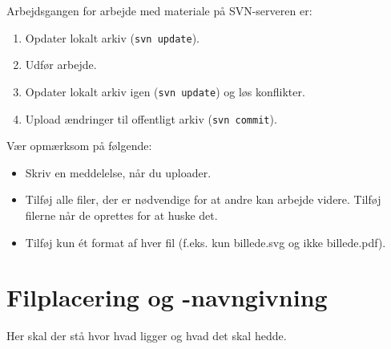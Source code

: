 \documentclass[simple,final]{../mypaper}
\begin{document}
Arbejdsgangen for arbejde med materiale på SVN-serveren er:

\begin{enumerate}
\item Opdater lokalt arkiv (\texttt{svn update}).
\item Udfør arbejde.
\item Opdater lokalt arkiv igen (\texttt{svn update}) og løs
  konflikter.
\item Upload ændringer til offentligt arkiv (\texttt{svn commit}).
\end{enumerate}

Vær opmærksom på følgende:

\begin{itemize}
\item Skriv en meddelelse, når du uploader.
\item Tilføj alle filer, der er nødvendige for at andre kan arbejde
  videre. Tilføj filerne når de oprettes for at huske det.
\item Tilføj kun ét format af hver fil (f.eks. kun billede.svg og ikke
  billede.pdf).
\end{itemize}


\section{Filplacering og -navngivning}

Her skal der stå hvor hvad ligger og hvad det skal hedde.
\end{document}
